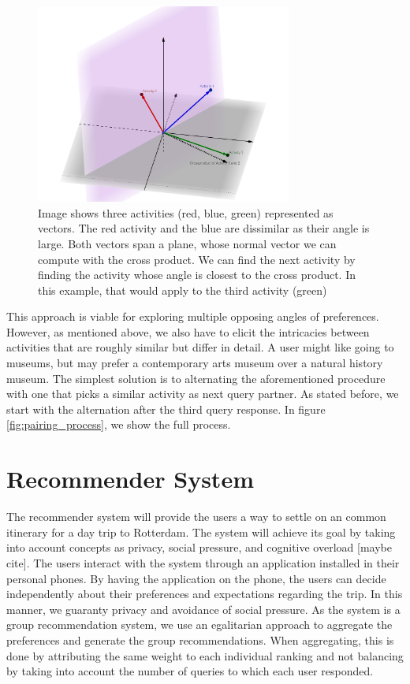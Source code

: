 \documentclass[11pt,a4paper,oneside]{article}
\begin{document}
\begin{figure}[H]
    \centering
    \includegraphics[width=0.75\textwidth]{paper/imgs/geogebra-export.png}
    \caption{Image shows three activities (red, blue, green) represented as vectors. The red activity and the blue are dissimilar as their angle is large. Both vectors span a plane, whose normal vector we can compute with the cross product. We can find the next activity by finding the activity whose angle is closest to the cross product. In this example, that would apply to the third activity (green)}
    \label{fig:item_vectors}
\end{figure}

This approach is viable for exploring multiple opposing angles of preferences. However, as mentioned above, we also have to elicit the intricacies between activities that are roughly similar but differ in detail. A user might like going to museums, but may prefer a contemporary arts museum over a natural history museum. The simplest solution is to alternating the aforementioned procedure with one that picks a similar activity as next query partner. As stated before, we start with the alternation after the third query response. 
In figure \autoref{fig:pairing_process}, we show the full process.

\section{Recommender System}
\label{sec:rs}
The recommender system will provide the users a way to settle on an common itinerary for a day trip to Rotterdam. The system will achieve its goal by taking into account concepts as privacy, social pressure, and cognitive overload [maybe cite]. The users interact with the system through an application installed in their personal phones. By having the application on the phone, the users can decide independently about their preferences and expectations regarding the trip. In this manner, we guaranty privacy and avoidance of social pressure. As the system is a group recommendation system, we use an egalitarian approach to aggregate the preferences and generate the group recommendations. When aggregating, this is done by attributing the same weight to each individual ranking and not balancing by taking into account the number of queries to which each user responded.
\end{document}
